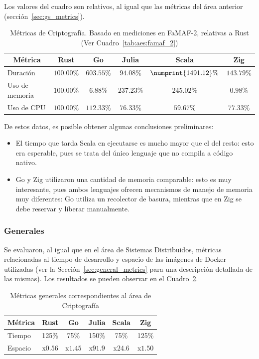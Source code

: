 \documentclass[11pt]{article}
\let\Oldsubsubsection\subsubsection
\renewcommand{\subsubsection}{\FloatBarrier\Oldsubsubsection}
\begin{document}
Los valores del cuadro son relativos, al igual que las métricas del área anterior (sección~\ref{sec:gs_metrics}).

\begin{table}[h]
\centering
\begin{tabular}{|l|c|c|c|c|c|}
\hline
\multicolumn{1}{|c|}{Métrica} & Rust & Go & Julia & Scala & Zig \\ \hline
Duración & $100.00\%$& $603.55\%$& $94.08\%$& $\numprint{1491.12}\%$& $143.79\%$\\ \hline
Uso de memoria & $100.00\%$& $6.88\%$& $237.23\%$& $245.02\%$& $0.98\%$\\ \hline
Uso de CPU & $100.00\%$& $112.33\%$& $76.33\%$& $59.67\%$& $77.33\%$\\ \hline
\end{tabular}
\caption{Métricas de Criptografía. Basado en mediciones en FaMAF-2, relativas a Rust  (Ver Cuadro~\ref{tab:aes:famaf_2})}
\label{tab:aes:metrics}
\end{table}

De estos datos, es posible obtener algunas conclusiones preliminares:

\begin{itemize}
    \item El tiempo que tarda Scala en ejecutarse es mucho mayor que el del resto: esto era esperable, pues se trata del único lenguaje que no compila a código nativo.
    \item Go y Zig utilizaron una cantidad de memoria comparable: esto es muy interesante, pues ambos lenguajes ofrecen mecanismos de manejo de memoria muy diferentes: Go utiliza un recolector de basura, mientras que en Zig se debe reservar y liberar manualmente.
\end{itemize}

\subsubsection{Generales}

Se evaluaron, al igual que en el área de Sistemas Distribuidos, métricas relacionadas al tiempo de desarrollo y espacio de las imágenes de Docker utilizadas (ver la Sección~\ref{sec:general_metrics} para una descripción detallada de las mismas). Los resultados se pueden observar en el Cuadro~\ref{tab:aes:relative_general_metrics}.

\begin{table}[h]
\centering
\begin{tabular}{|l|c|c|c|c|c|}
\hline
\multicolumn{1}{|c|}{Métrica} & Rust & Go & Julia & Scala & Zig \\ \hline
Tiempo & 125\% & 75\% & 150\% & 75\% & 125\% \\ \hline
Espacio & x$0.56$ & x$1.45$ & x$91.9$ & x$24.6$ & x$1.50$ \\ \hline
\end{tabular}
\caption{Métricas generales correspondientes al área de Criptografía}
\label{tab:aes:relative_general_metrics}
\end{table}
\end{document}
